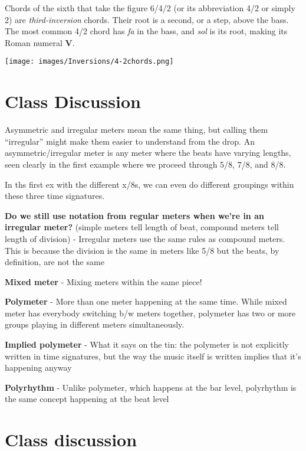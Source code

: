 \documentclass{book}
\begin{document}
Chords of the sixth that take the figure 6/4/2 (or its abbreviation 4/2 or
simply 2) are \emph{third-inversion} chords. Their root is a second, or a
step, above the bass. The most common 4/2 chord has \emph{fa} in the bass, and
\emph{sol} is its root, making its Roman numeral \textbf{V}.

\texttt{[image: images/Inversions/4-2chords.png]}

\hypertarget{class-discussion-13}{%
\chapter{Class Discussion}\label{class-discussion-13}}

Asymmetric and irregular meters mean the same thing, but calling them
``irregular'' might make them easier to understand from the drop. An
asymmetric/irregular meter is any meter where the beats have varying lengths,
seen clearly in the first example where we proceed through 5/8, 7/8, and 8/8.

In ths first ex with the different x/8s, we can even do different groupings
within these three time signatures.

\textbf{Do we still use notation from regular meters when we're in an
irregular meter?} (simple meters tell length of beat, compound meters tell
length of division) - Irregular meters use the same rules as compound meters.
This is because the division is the same in meters like 5/8 but the beats, by
definition, are not the same

\textbf{Mixed meter} - Mixing meters within the same piece!

\textbf{Polymeter} - More than one meter happening at the same time. While
mixed meter has everybody switching b/w meters together, polymeter has two or
more groups playing in different meters simultaneously.

\textbf{Implied polymeter} - What it says on the tin: the polymeter is not
explicitly written in time signatures, but the way the music itself is written
implies that it's happening anyway

\textbf{Polyrhythm} - Unlike polymeter, which happens at the bar level,
polyrhythm is the same concept happening at the beat level

\hypertarget{class-discussion-14}{%
\chapter{Class discussion}\label{class-discussion-14}}
\end{document}
